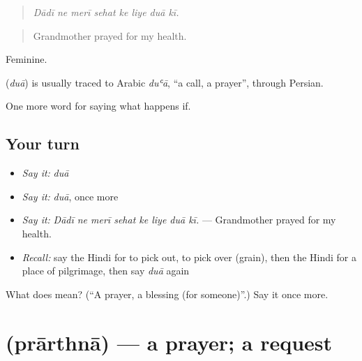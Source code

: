 \begin{quote}
       
\end{quote}

\begin{quote}
\emph{Dādī ne merī sehat ke liye duā kī.}
\end{quote}

\begin{quote}
Grandmother prayed for my health.
\end{quote}

Feminine.

\begin{cousinweb}
\textbf{} (\emph{duā}) is usually traced to Arabic \emph{duʿā}, \textquotedblleft{}a call, a prayer\textquotedblright{}, through Persian.
\end{cousinweb}

\begin{grammarlens}[title={What you've built}]
One more word for saying what happens if.
\end{grammarlens}

\subsection*{Your turn}
\begin{itemize}
\raggedright
  \item \emph{Say it:} \emph{duā}
  \item \emph{Say it:} \emph{duā}, once more
  \item \emph{Say it:} \emph{Dādī ne merī sehat ke liye duā kī.} — Grandmother prayed for my health.
  \item \emph{Recall:} say the Hindi for to pick out, to pick over (grain), then the Hindi for a place of pilgrimage, then say \emph{duā} again
\end{itemize}

\begin{tcolorbox}[breakable,colback=teal!4,colframe=teal!35!black,title={Before you move on}]
What does  mean? (\textquotedblleft{}A prayer, a blessing (for someone)\textquotedblright{}.) Say it once more.
\end{tcolorbox}
\section[\texorpdfstring{\hi{प्रार्थना} (prārthnā)}{प्रार्थना (prārthnā)}]{ (prārthnā) — a prayer; a request}


